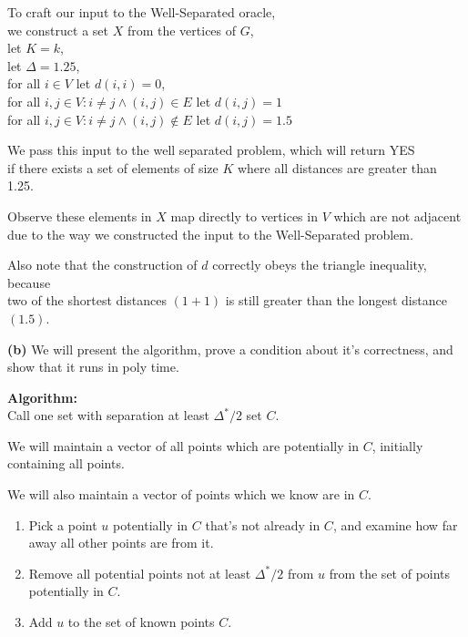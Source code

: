 \documentclass[11pt]{article}
\renewcommand{\part}[1] {\vspace{.10in} {\bf (#1)}}
\begin{document}
To craft our input to the Well-Separated oracle,\\
we construct a set $X$ from the vertices of $G$,\\
let $K = k$,\\
let $\Delta = 1.25$,\\
for all $i \in V$ let $d(i,i) = 0$,\\
for all $i,j \in V : i \neq j \wedge (i,j) \in E$ let $d(i,j) = 1$\\
for all $i,j \in V : i \neq j \wedge (i,j) \notin E$ let $d(i,j) = 1.5$

We pass this input to the well separated problem, which will return YES\\
if there exists a set of elements of size $K$ where all distances are greater than 1.25.

Observe these elements in $X$ map directly to vertices in $V$ which are not adjacent\\
due to the way we constructed the input to the Well-Separated problem.

Also note that the construction of $d$ correctly obeys the triangle inequality, because\\
two of the shortest distances $(1 + 1)$ is still greater than the longest distance $(1.5)$.


\part{b}
We will present the algorithm, prove a condition about it's correctness, and show that it runs in poly time.

\textbf{Algorithm:}\\
Call one set with separation at least $\Delta^{*} / 2$ set $C$.

We will maintain a vector of all points which are potentially in $C$, initially containing all points.

We will also maintain a vector of points which we know are in $C$.

\begin{enumerate}
\item Pick a point $u$ potentially in $C$ that's not already in $C$, and examine how far away all other points are from it.
\item Remove all potential points not at least $\Delta^{*} / 2$ from $u$ from the set of points potentially in $C$.
\item Add $u$ to the set of known points $C$.
\end{enumerate}
\end{document}
